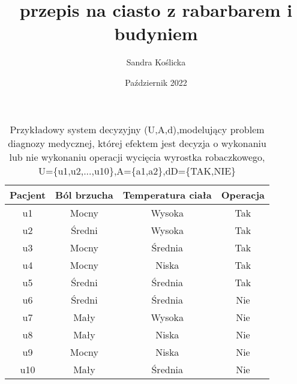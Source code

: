 \documentclass[12pt, letterpaper, titlepage]{article}
\title{przepis na ciasto z rabarbarem i budyniem}
\author{Sandra Koślicka}
\date{Październik 2022}
\begin{document}
\maketitle


\begin{table}[h]
\centering\caption{Przykładowy system decyzyjny (U,A,d),modelujący problem diagnozy medycznej, której efektem jest decyzja o wykonaniu lub nie wykonaniu operacji wycięcia wyrostka robaczkowego, U=\{u{1},u{2},...,u{10}\},A=\{a{1},a{2}\},d\in D=\{TAK,NIE\}}
\begin{tabular}{c|c c c}
	\hline
	\hline
	Pacjent & Ból brzucha & Temperatura ciała & Operacja\\
	\hline
	u1 & Mocny & Wysoka & Tak\\
	u2 & Średni & Wysoka & Tak\\
	u3 & Mocny & Średnia & Tak\\
	u4 & Mocny & Niska & Tak\\
	u5 & Średni & Średnia & Tak\\
	u6 & Średni & Średnia & Nie\\
	u7 & Mały & Wysoka & Nie\\
	u8 & Mały & Niska & Nie\\
	u9 & Mocny & Niska & Nie\\
	u10 & Mały & Średnia & Nie\\
	\hline
	\hline
\end{tabular}
\end{table}
\end{document}
